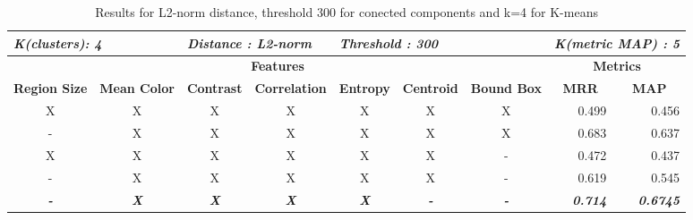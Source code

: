 \begin{table}[H]
\centering
\begin{tabular}{|c|c|c|c|c|c|c|r|r|}
\hline
\multicolumn{2}{|l|}{\textit{\textbf{K(clusters): 4}}} & \multicolumn{2}{l|}{\textit{\textbf{Distance : L2-norm}}} & \multicolumn{3}{l|}{\textit{\textbf{Threshold : 300}}} & \multicolumn{2}{l|}{\textit{\textbf{K(metric MAP) :  5}}} \\ \hline
\multicolumn{7}{|c|}{\textbf{Features}} & \multicolumn{2}{c|}{\textbf{Metrics}} \\ \hline
\textbf{Region Size} & \textbf{Mean Color} & \textbf{Contrast} & \textbf{Correlation} & \textbf{Entropy} & \textbf{Centroid} & \textbf{Bound Box} & \multicolumn{1}{c|}{\textbf{MRR}} & \multicolumn{1}{c|}{\textbf{MAP}} \\ \hline
X & X & X & X & X & X & X & 0.499 & 0.456 \\ \hline
- & X & X & X & X & X & X & 0.683 & 0.637 \\ \hline
X & X & X & X & X & X & - & 0.472 & 0.437 \\ \hline
- & X & X & X & X & X & - & 0.619 & 0.545 \\ \hline
\textit{\textbf{-}} & \textit{\textbf{X}} & \textit{\textbf{X}} & \textit{\textbf{X}} & \textit{\textbf{X}} & \textit{\textbf{-}} & \textit{\textbf{-}} & \textit{\textbf{0.714}} & \textit{\textbf{0.6745}} \\ \hline
\end{tabular}
\caption{Results for L2-norm distance, threshold 300 for conected components and k=4 for K-means}
\label{table:results03}
\end{table}



